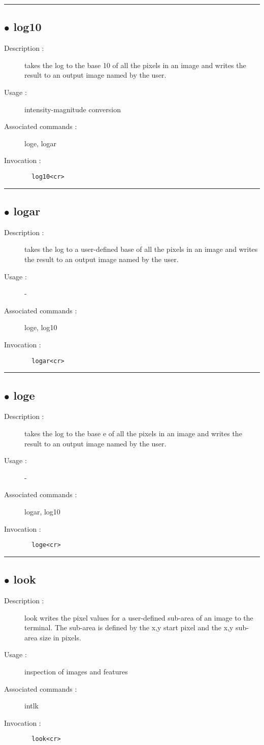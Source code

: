 \hrule \subsection*{$\bullet$ log10}
\begin{description}
\item[Description :] takes the log to the base 10 of all the pixels in an image and
writes the result to an output image named by the user.
\item[Usage :] intensity-magnitude conversion
\item[Associated commands :] loge, logar
\item[Invocation :]

\verb+  log10<cr> +\end{description}

\hrule \subsection*{$\bullet$ logar}
\begin{description}
\item[Description :] takes the log to a user-defined base of all the pixels in an
image and writes the result to an output image named by the user.
\item[Usage :] -
\item[Associated commands :] loge, log10
\item[Invocation :]

\verb+  logar<cr> +\end{description}

\hrule \subsection*{$\bullet$ loge}
\begin{description}
\item[Description :] takes the log to the base e of all the pixels in an image and
writes the result to an output image named by the user.
\item[Usage :] -
\item[Associated commands :] logar, log10
\item[Invocation :]

\verb+  loge<cr> +\end{description}

\hrule \subsection*{$\bullet$ look}
\begin{description}
\item[Description :] look writes the pixel values for a user-defined sub-area of an
image to the terminal. The sub-area is defined by the x,y start pixel and
the x,y sub-area size in pixels.
\item[Usage :] inspection of images and features
\item[Associated commands :] intlk
\item[Invocation :]

\verb+  look<cr> +\end{description}


